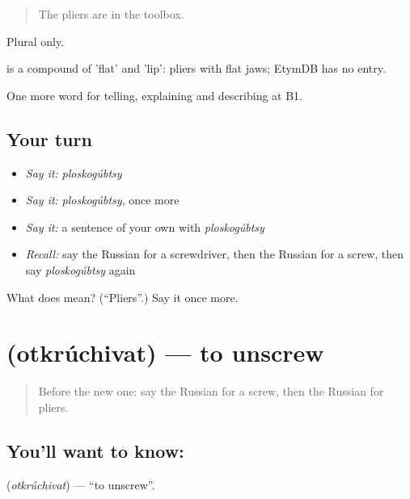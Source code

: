 \begin{quote}
The pliers are in the toolbox.
\end{quote}

Plural only.

\begin{cousinweb}
\emph{} is a compound of \emph{} 'flat' and \emph{} 'lip': pliers with flat jaws; EtymDB has no entry.
\end{cousinweb}

\begin{grammarlens}[title={What you've built}]
One more word for telling, explaining and describing at B1.
\end{grammarlens}

\subsection*{Your turn}
\begin{itemize}
\raggedright
  \item \emph{Say it:} \emph{ploskogúbtsy}
  \item \emph{Say it:} \emph{ploskogúbtsy}, once more
  \item \emph{Say it:} a sentence of your own with \emph{ploskogúbtsy}
  \item \emph{Recall:} say the Russian for a screwdriver, then the Russian for a screw, then say \emph{ploskogúbtsy} again
\end{itemize}

\begin{tcolorbox}[breakable,colback=teal!4,colframe=teal!35!black,title={Before you move on}]
What does  mean? (\textquotedblleft{}Pliers\textquotedblright{}.) Say it once more.
\end{tcolorbox}
\section[\texorpdfstring{\ru{откручивать} (otkrúchivat)}{откручивать (otkrúchivat)}]{ (otkrúchivat) — to unscrew}

\label{lesson:RU-C533-otkruchivat}



\begin{quote}
Before the new one: say the Russian for a screw, then the Russian for pliers.
\end{quote}

\subsection*{You'll want to know: }
\textbf{} (\emph{otkrúchivat}) — \textquotedblleft{}to unscrew\textquotedblright{}.


